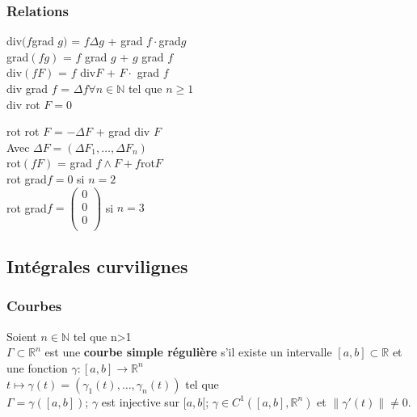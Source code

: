 \documentclass[../main.tex]{subfiles}
\begin{document}
\subsubsection{Relations}
\begin{minipage}{.5\textwidth}
    div$(f $grad $g)$ = $f \Delta g$ + grad $f\cdot $grad$ g$\\
    grad$(fg)$ = $f$ grad $g$ + $g$ grad $f$\\
    div$(fF)$ = $f$ div$F$ + $F\cdot$ grad $f$\\
    div grad $f$ = $\Delta f \forall n \in \mathbb{N}$ tel que $n\geq 1$\\
    div rot $F = 0$\\
\end{minipage}
\hfill
\begin{minipage}{.5\textwidth}
    rot rot $F$ = $-\Delta F$ + grad div $F$\\
    Avec $\Delta F = (\Delta F_1, \dots, \Delta F_n)$\\
    rot$(fF)$ = grad $f\wedge F + f $rot$ F$\\
    rot grad$f = 0$ si $n=2$\\
    rot grad$f = \begin{pmatrix}
        0\\
        0\\
        0\\
    \end{pmatrix}$ si $n=3$\\
\end{minipage}

\subsection{Intégrales curvilignes}
\subsubsection{Courbes}
Soient $n\in \mathbb{N}$ tel que n>1\\

$\Gamma \subset \mathbb{R}^n$ est une \textbf{courbe simple régulière} s'il existe un intervalle $[a,b] \subset \mathbb{R}$ et une fonction $\gamma : [a,b] \rightarrow \mathbb{R}^n$\\
$t\mapsto \gamma(t) = (\gamma_1(t), \dots, \gamma_n(t))$ tel que\\
$\Gamma = \gamma([a,b])$; $\gamma$ est injective sur $[a,b[$; $\gamma\in C^1([a,b], \mathbb{R}^n)$ et $\parallel \gamma'(t)\parallel \neq 0$.\\
\end{document}
